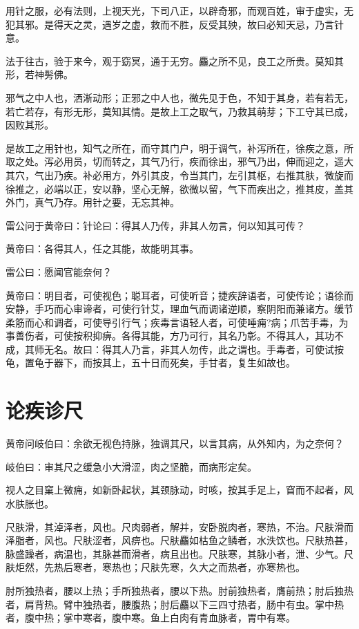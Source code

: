 \documentclass[a4paper,12pt,UTF8,twoside]{ctexbook}
\begin{document}
	用针之服，必有法则，上视天光，下司八正，以辟奇邪，而观百姓，审于虚实，无犯其邪。是得天之灵，遇岁之虚，救而不胜，反受其殃，故曰必知天忌，乃言针意。
	
	法于往古，验于来今，观于窈冥，通于无穷。麤之所不见，良工之所贵。莫知其形，若神髣佛。
	
	邪气之中人也，洒淅动形；正邪之中人也，微先见于色，不知于其身，若有若无，若亡若存，有形无形，莫知其情。是故上工之取气，乃救其萌芽；下工守其已成，因败其形。
	
	是故工之用针也，知气之所在，而守其门户，明于调气，补泻所在，徐疾之意，所取之处。泻必用员，切而转之，其气乃行，疾而徐出，邪气乃出，伸而迎之，遥大其穴，气出乃疾。补必用方，外引其皮，令当其门，左引其枢，右推其肤，微旋而徐推之，必端以正，安以静，坚心无解，欲微以留，气下而疾出之，推其皮，盖其外门，真气乃存。用针之要，无忘其神。
	
	雷公问于黄帝曰：针论曰：得其人乃传，非其人勿言，何以知其可传？
	
	黄帝曰：各得其人，任之其能，故能明其事。
	
	雷公曰：愿闻官能奈何？
	
	黄帝曰：明目者，可使视色；聪耳者，可使听音；捷疾辞语者，可使传论；语徐而安静，手巧而心审谛者，可使行针艾，理血气而调诸逆顺，察阴阳而兼诸方。缓节柔筋而心和调者，可使导引行气；疾毒言语轻人者，可使唾痈?病；爪苦手毒，为事善伤者，可使按积抑痹。各得其能，方乃可行，其名乃彰。不得其人，其功不成，其师无名。故曰：得其人乃言，非其人勿传，此之谓也。手毒者，可使试按龟，置龟于器下，而按其上，五十日而死矣，手甘者，复生如故也。
	
	\chapter{论疾诊尺}
	
	黄帝问岐伯曰：余欲无视色持脉，独调其尺，以言其病，从外知内，为之奈何？
	
	岐伯曰：审其尺之缓急小大滑涩，肉之坚脆，而病形定矣。
	
	视人之目窠上微痈，如新卧起状，其颈脉动，时咳，按其手足上，窅而不起者，风水肤胀也。
	
	尺肤滑，其淖泽者，风也。尺肉弱者，解并，安卧脱肉者，寒热，不治。尺肤滑而泽脂者，风也。尺肤涩者，风痹也。尺肤麤如枯鱼之鳞者，水泆饮也。尺肤热甚，脉盛躁者，病温也，其脉甚而滑者，病且出也。尺肤寒，其脉小者，泄、少气。尺肤炬然，先热后寒者，寒热也；尺肤先寒，久大之而热者，亦寒热也。
	
	肘所独热者，腰以上热；手所独热者，腰以下热。肘前独热者，膺前热；肘后独热者，肩背热。臂中独热者，腰腹热；肘后麤以下三四寸热者，肠中有虫。掌中热者，腹中热；掌中寒者，腹中寒。鱼上白肉有青血脉者，胃中有寒。
	
\end{document}
